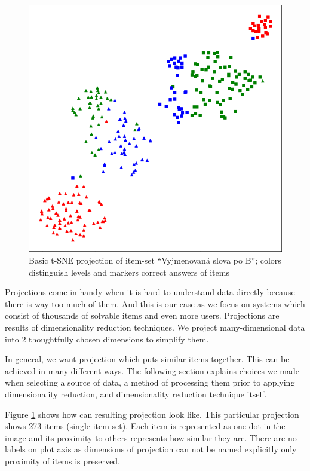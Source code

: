 \documentclass[
  digital, %
  table,   %
  nolof,     %
  nolot,     %
  nocover,
  color,
  final, %
]{fithesis3}
\begin{document}
\begin{figure}
    \includegraphics[width=\textwidth]{img/common_projection}
  \caption{Basic t-SNE projection of item-set ``Vyjmenovaná slova po B''; colors distinguish levels and markers correct answers of items}
  \label{fig:common_projection}
\end{figure}


Projections come in handy when it is hard to understand data directly because there is way too much of them. And this is our case as we focus on systems which consist of thousands of solvable items and even more users. Projections are results of dimensionality reduction techniques. We project many-dimensional data into 2 thoughtfully chosen dimensions to simplify them.


In general, we want projection which puts similar items together. This can be achieved in many different ways. The following section explains choices we made when selecting a source of data, a method of processing them prior to applying dimensionality reduction, and dimensionality reduction technique itself.


Figure \ref{fig:common_projection} shows how can resulting projection look like. This particular projection shows 273 items (single item-set). Each item is represented as one dot in the image and its proximity to others represents how similar they are. There are no labels on plot axis as dimensions of projection can not be named explicitly only proximity of items is preserved.
\end{document}
